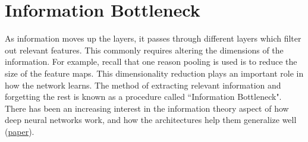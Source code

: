 \section{Information Bottleneck}
As information moves up the layers, it passes through different layers which filter out relevant features.
This commonly requires altering the dimensions of the information.
For example, recall that one reason pooling is used is to reduce the size of the feature maps.
This dimensionality reduction plays an important role in how the network learns.
The method of extracting relevant information and forgetting the rest is known as a procedure called ``Information Bottleneck".
There has been an increasing interest in the information theory aspect of how deep neural networks work, and how the architectures help them generalize well (\href{https://openreview.net/forum?id=ry_WPG-A-}{paper}).